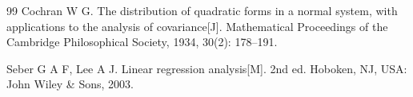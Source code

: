 \documentclass[UTF8,a4paper,zihao=-4]{ctexart}
\begin{document}
{\begin{thebibliography}{99}
 Cochran W G. The distribution of quadratic forms in a normal system, with applications to the analysis of covariance[J]. Mathematical Proceedings of the Cambridge Philosophical Society, 1934, 30(2): 178--191.

 Seber G A F, Lee A J. Linear regression analysis[M]. 2nd ed. Hoboken, NJ, USA: John Wiley \& Sons, 2003.

\end{thebibliography}
}
\end{document}
